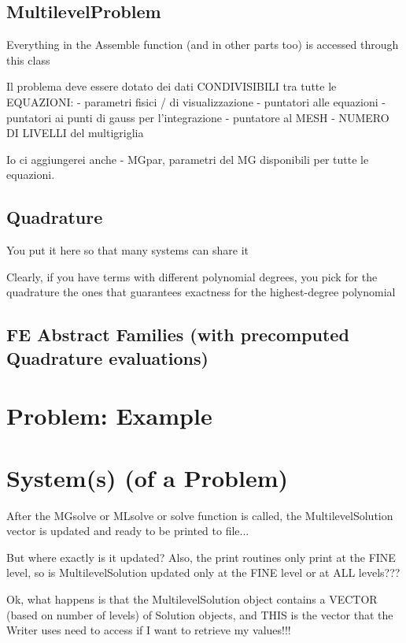 \documentclass[10pt]{book}
\begin{document}
  
    \section{MultilevelProblem}

  Everything in the Assemble function (and in other parts too) is accessed through this class
  
Il problema deve essere dotato dei dati CONDIVISIBILI tra tutte le EQUAZIONI:
   - parametri fisici / di visualizzazione
   - puntatori alle equazioni
   - puntatori ai punti di gauss per l'integrazione
   - puntatore al MESH
   - NUMERO DI LIVELLI del multigriglia

Io ci aggiungerei anche 
   - MGpar, parametri del MG disponibili per tutte le equazioni.
   
\section{ Quadrature }

You put it here so that many systems can share it

Clearly, if you have terms with different polynomial degrees,
you pick for the quadrature the ones that guarantees exactness for the highest-degree polynomial
  
\section{FE Abstract Families (with precomputed Quadrature evaluations)}
  
  
 \chapter{Problem: Example}
  
  \chapter{System(s) (of a Problem)}


  
     After the MGsolve or MLsolve or solve function is called,
   the MultilevelSolution vector is updated and ready to be printed to file...
   
   But where exactly is it updated?
   Also, the print routines only print at the FINE level,
   so is MultilevelSolution updated only at the FINE level or at ALL levels???
   
   Ok, what happens is that the MultilevelSolution object contains a VECTOR (based on number of levels) of Solution objects,
   and THIS is the vector that the Writer uses need to access if I want to retrieve my values!!!
   
\end{document}
